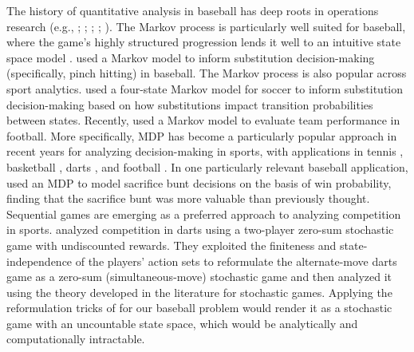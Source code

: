 \documentclass[aoas]{imsart}
\begin{document}
    The history of quantitative analysis in baseball has deep roots in operations research (e.g., \citealp{lindsey_investigation_1963}; \citealp{freeze_analysis_1974}; \citealp{pankin_evaluating_1978}; \citealp{russell_devising_1994}; \citealp{bukiet_markov_1997}). The Markov process is particularly well suited for baseball, where the game's highly structured progression lends it well to an intuitive state space model \citep{sokol_intuitive_2004}. \citet{hirotsu_markov_2003} used a Markov model to inform substitution decision-making (specifically, pinch hitting) in baseball. The Markov process is also popular across sport analytics. \citet{hirotsu_using_2002} used a four-state Markov model for soccer to inform substitution decision-making based on how substitutions impact transition probabilities between states. Recently, \citet{chan_points_2021} used a Markov model to evaluate team performance in football. More specifically, MDP has become a particularly popular approach in recent years for analyzing decision-making in sports, with applications in tennis \citep{nadimpalli_when_2013}, basketball \citep{sandholtz_markov_2020}, darts \citep{baird_optimising_2020}, and football \citep{biro_reinforcement_2022}. In one particularly relevant baseball application, \citet{hirotsu_using_2019} used an MDP to model sacrifice bunt decisions on the basis of win probability, finding that the sacrifice bunt was more valuable than previously thought. Sequential games are emerging as a preferred approach to analyzing competition in sports. \citet{haugh2022play} analyzed competition in darts using a two-player zero-sum stochastic game with undiscounted rewards. They exploited the finiteness and state-independence of the players' action sets to reformulate the alternate-move darts game as a zero-sum (simultaneous-move) stochastic game and then analyzed it using the theory developed in the literature for stochastic games. Applying the reformulation tricks of \citet{haugh2022play} for our baseball problem would render it as a stochastic game with an uncountable state space, which would be analytically and computationally intractable.
\end{document}
